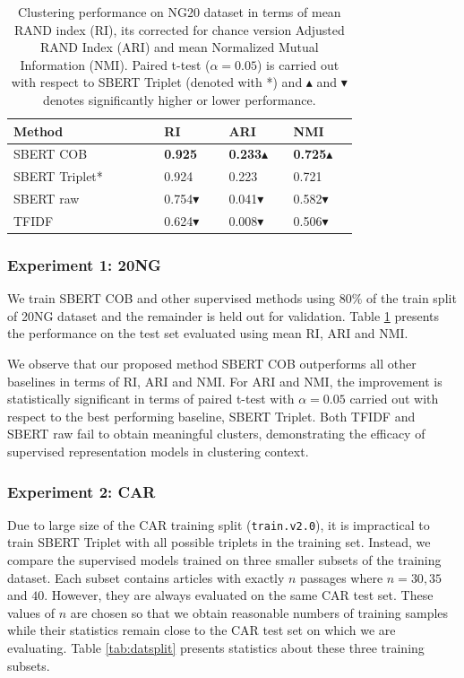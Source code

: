 \documentclass[11pt,a4paper]{article}
\begin{document}
\begin{table}[t]
\begin{small}
\caption{Clustering performance on NG20 dataset in terms of mean RAND index (RI), its corrected for chance version Adjusted RAND Index (ARI) and mean Normalized Mutual Information (NMI). Paired t-test ($\alpha=0.05$) is carried out with respect to SBERT Triplet (denoted with *) and $\blacktriangle$ and $\blacktriangledown$ denotes significantly higher or lower performance.}
\label{tab:ng20exp}
\begin{tabular}{p{0.35\linewidth}p{0.15\linewidth}p{0.15\linewidth}p{0.15\linewidth}}
\hline
Method        & RI & ARI & NMI \\ \hline
SBERT COB     & \textbf{0.925} & \textbf{0.233}$\blacktriangle$ & \textbf{0.725}$\blacktriangle$ \\
SBERT Triplet* & 0.924 & 0.223 & 0.721 \\
SBERT raw           & 0.754$\blacktriangledown$ & 0.041$\blacktriangledown$ & 0.582$\blacktriangledown$ \\
TFIDF         & 0.624$\blacktriangledown$ & 0.008$\blacktriangledown$ & 0.506$\blacktriangledown$ \\
\end{tabular}
\end{small}
\end{table}
\subsubsection{Experiment 1: 20NG} We train SBERT COB and other supervised methods using $80\%$ of the train split of 20NG dataset and the remainder is held out for validation. Table \ref{tab:ng20exp} presents the performance on the test set evaluated using mean RI, ARI and NMI.

We observe that our proposed method SBERT COB outperforms all other baselines in terms of RI, ARI and NMI. For ARI and NMI, the improvement is statistically significant in terms of paired t-test with $\alpha=0.05$ carried out with respect to the best performing baseline, SBERT Triplet. Both TFIDF and SBERT raw fail to obtain meaningful clusters, demonstrating the efficacy of supervised representation models in clustering context.

\subsubsection{Experiment 2: CAR} Due to large size of the CAR training split (\texttt{train.v2.0}), it is impractical to train SBERT Triplet with all possible triplets in the training set. Instead, we compare the supervised models trained on three smaller subsets of the training dataset. Each subset contains articles with exactly $n$ passages where $n=30, 35$ and $40$. However, they are always evaluated on the same CAR test set. These values of $n$ are chosen so that we obtain reasonable numbers of training samples while their statistics remain close to the CAR test set on which we are evaluating. Table \ref{tab:datsplit} presents statistics about these three training subsets. 
\end{document}
